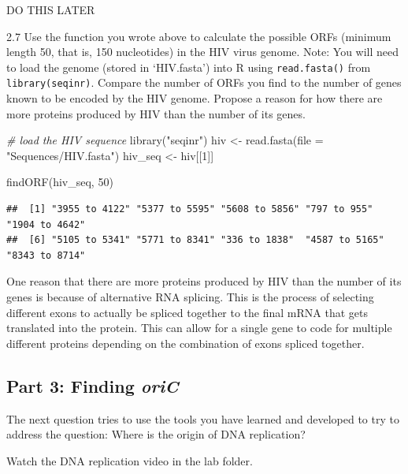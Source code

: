\documentclass[
]{article}
\newenvironment{Shaded}{\begin{snugshade}}{\end{snugshade}}
\newcommand{\AttributeTok}[1]{\textcolor[rgb]{0.77,0.63,0.00}{#1}}
\newcommand{\CommentTok}[1]{\textcolor[rgb]{0.56,0.35,0.01}{\textit{#1}}}
\newcommand{\DecValTok}[1]{\textcolor[rgb]{0.00,0.00,0.81}{#1}}
\newcommand{\FunctionTok}[1]{\textcolor[rgb]{0.00,0.00,0.00}{#1}}
\newcommand{\NormalTok}[1]{#1}
\newcommand{\OtherTok}[1]{\textcolor[rgb]{0.56,0.35,0.01}{#1}}
\newcommand{\StringTok}[1]{\textcolor[rgb]{0.31,0.60,0.02}{#1}}
\begin{document}
{ DO THIS LATER }

2.7 Use the function you wrote above to calculate the possible ORFs
(minimum length 50, that is, 150 nucleotides) in the HIV virus genome.
Note: You will need to load the genome (stored in `HIV.fasta') into R
using \texttt{read.fasta()} from \texttt{library(seqinr)}. Compare the
number of ORFs you find to the number of genes known to be encoded by
the HIV genome. Propose a reason for how there are more proteins
produced by HIV than the number of its genes.\span

\begin{Shaded}
\begin{Highlighting}[]
\CommentTok{\# load the HIV sequence}
\FunctionTok{library}\NormalTok{(}\StringTok{"seqinr"}\NormalTok{)}
\NormalTok{hiv }\OtherTok{\textless{}{-}} \FunctionTok{read.fasta}\NormalTok{(}\AttributeTok{file =} \StringTok{"Sequences/HIV.fasta"}\NormalTok{)}
\NormalTok{hiv\_seq }\OtherTok{\textless{}{-}}\NormalTok{ hiv[[}\DecValTok{1}\NormalTok{]]}

\FunctionTok{findORF}\NormalTok{(hiv\_seq, }\DecValTok{50}\NormalTok{)}
\end{Highlighting}
\end{Shaded}

\begin{verbatim}
##  [1] "3955 to 4122" "5377 to 5595" "5608 to 5856" "797 to 955"   "1904 to 4642"
##  [6] "5105 to 5341" "5771 to 8341" "336 to 1838"  "4587 to 5165" "8343 to 8714"
\end{verbatim}

{ One reason that there are more proteins produced by HIV than the
number of its genes is because of alternative RNA splicing. This is the
process of selecting different exons to actually be spliced together to
the final mRNA that gets translated into the protein. This can allow for
a single gene to code for multiple different proteins depending on the
combination of exons spliced together. }

\hypertarget{part-3-finding-oric}{%
\subsection{\texorpdfstring{Part 3: Finding
\emph{oriC}}{Part 3: Finding oriC}}\label{part-3-finding-oric}}

The next question tries to use the tools you have learned and developed
to try to address the question: Where is the origin of DNA replication?

Watch the DNA replication video in the lab folder. \span
\end{document}
